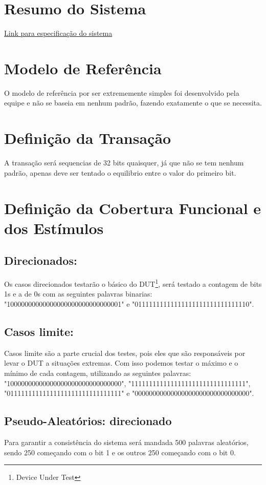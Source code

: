 \documentclass[
    12pt,
    a4paper,
    oneside,
    chapter=TITLE,
    section=TITLE,
    subsection=TITLE,
    subsubsection=TITLE,
    english,
    french,
    spanish,
    brazil,
    ]{abntex2}
\begin{document}
\frenchspacing 
\imprimircapa
\imprimirfolhaderosto

\tableofcontents*
\cleardoublepage

\textual

\chapter{Resumo do Sistema}
\href{run:../specifications/BitCounter.pdf}{Link para especificação do sistema}

\chapter{Modelo de Referência}
O modelo de referência por ser extrememente simples foi desenvolvido pela equipe e não se baseia em nenhum padrão, fazendo exatamente o que se necessita.

\chapter{Definição da Transação}
A transação será sequencias de 32 bits quaisquer, já que não se tem nenhum padrão, apenas deve ser tentado o equilibrio entre o valor do primeiro bit.

\chapter{Definição da Cobertura Funcional e dos Estímulos}
\section{Direcionados:}
Os casos direcionados testarão o básico do DUT\footnote{Device Under Test}, será testado a contagem de bits 1s e a de 0s com as seguintes palavras binarias: "10000000000000000000000000000001" e "01111111111111111111111111111110".

\section{Casos limite:}
Casos limite são a parte crucial dos testes, pois eles que são responsáveis por levar o DUT a situações extremas. Com isso podemos testar o máximo e o mínimo de cada contagem, utilizando as seguintes palavras: "10000000000000000000000000000000", "11111111111111111111111111111111", "01111111111111111111111111111111" e "00000000000000000000000000000000".

\section{Pseudo-Aleatórios: direcionado}
Para garantir a consistência do sistema será mandada 500 palavras aleatórios, sendo 250 começando com o bit 1 e os outros 250 começando com o bit 0.
\end{document}
